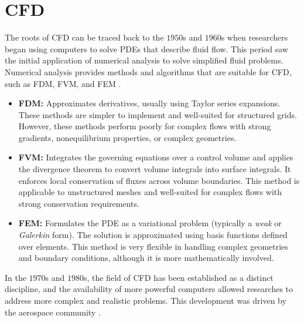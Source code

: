 \section{\gls{CFD}\label{ch3:cfdBackround}}
        The roots of \gls{CFD} can be traced back to the $1950$s and $1960$s when
        researchers began using computers to solve \glspl{PDE} that describe
        fluid flow. This period saw the initial application of numerical
        analysis to solve simplified fluid problems.\\

        Numerical analysis provides methods and algorithms that are suitable
        for \gls{CFD}, such as \gls{FDM}, \gls{FVM}, and \gls{FEM}
        \cite{Greenshields2022}.
        \begin{itemize}
            \item \textbf{\gls{FDM}:} Approximates derivatives, usually using
                Taylor series expansions. These methods are simpler to
                implement and well-suited for structured grids. However, these
                methods perform poorly for complex flows with strong gradients,
                nonequilibrium properties, or complex geometries.
            \item \textbf{\gls{FVM}:} Integrates the governing equations over a
                control volume and applies the divergence theorem to convert
                volume integrals into surface integrals. It enforces local
                conservation of fluxes across volume boundaries. This method is
                applicable to unstructured meshes and well-suited for complex
                flows with strong conservation requirements.
            \item \textbf{\gls{FEM}:} Formulates the \gls{PDE} as a variational
                problem (typically a \textit{weak} or \textit{Galerkin} form).
                The solution is approximated using basis functions defined over
                elements. This method is very flexible in handling complex
                geometries and boundary conditions, although it is more
                mathematically involved.  
        \end{itemize}

        In the $1970$s and $1980$s, the field of \gls{CFD} has been established as a
        distinct discipline, and the availability of more powerful computers
        allowed researches to address more complex and realistic problems. This
        development was driven by the aerospace community \cite{Anderson1995}.\\

